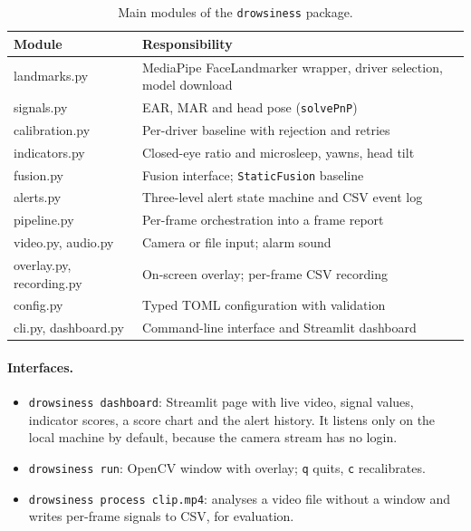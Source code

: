 \documentclass[12pt,a4paper]{article}
\newcommand{\code}[1]{\texttt{#1}}
\begin{document}
\begin{table}[htbp]
\centering
\caption{Main modules of the \code{drowsiness} package.}
\label{tab:modules}
\begin{tabularx}{\textwidth}{>{\ttfamily}lX}
\toprule
\normalfont Module & Responsibility \\
\midrule
landmarks.py & MediaPipe FaceLandmarker wrapper, driver selection, model download \\
signals.py & EAR, MAR and head pose (\code{solvePnP}) \\
calibration.py & Per-driver baseline with rejection and retries \\
indicators.py & Closed-eye ratio and microsleep, yawns, head tilt \\
fusion.py & Fusion interface; \code{StaticFusion} baseline \\
alerts.py & Three-level alert state machine and CSV event log \\
pipeline.py & Per-frame orchestration into a frame report \\
video.py, audio.py & Camera or file input; alarm sound \\
overlay.py, recording.py & On-screen overlay; per-frame CSV recording \\
config.py & Typed TOML configuration with validation \\
cli.py, dashboard.py & Command-line interface and Streamlit dashboard \\
\bottomrule
\end{tabularx}
\end{table}

\paragraph{Interfaces.}
\begingroup\raggedright
\begin{itemize}
\item \code{drowsiness dashboard}: Streamlit page with live video, signal values, indicator scores, a score chart and the alert history. It listens only on the local machine by default, because the camera stream has no login.
\item \code{drowsiness run}: OpenCV window with overlay; \code{q} quits, \code{c} recalibrates.
\item \code{drowsiness process clip.mp4}: analyses a video file without a window and writes per-frame signals to CSV, for evaluation.
\end{itemize}
\endgroup
\end{document}
